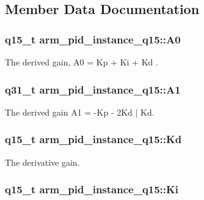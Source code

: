 \subsection{Member Data Documentation}
\hypertarget{structarm__pid__instance__q15_ad77f3a2823c7f96de42c92a3fbf3246b}{
\subsubsection[{A0}]{\setlength{\rightskip}{0pt plus 5cm}q15\-\_\-t arm\-\_\-pid\-\_\-instance\-\_\-q15\-::\-A0}}\label{structarm__pid__instance__q15_ad77f3a2823c7f96de42c92a3fbf3246b}
The derived gain, A0 = Kp + Ki + Kd . \hypertarget{structarm__pid__instance__q15_a1b8412c517071962a9acfdc6778906ec}{
\subsubsection[{A1}]{\setlength{\rightskip}{0pt plus 5cm}q31\-\_\-t arm\-\_\-pid\-\_\-instance\-\_\-q15\-::\-A1}}\label{structarm__pid__instance__q15_a1b8412c517071962a9acfdc6778906ec}
The derived gain A1 = -\/\-Kp -\/ 2\-Kd $\vert$ Kd. \hypertarget{structarm__pid__instance__q15_af5d4b53091f19eff7536636b7cc43111}{
\subsubsection[{Kd}]{\setlength{\rightskip}{0pt plus 5cm}q15\-\_\-t arm\-\_\-pid\-\_\-instance\-\_\-q15\-::\-Kd}}\label{structarm__pid__instance__q15_af5d4b53091f19eff7536636b7cc43111}
The derivative gain. \hypertarget{structarm__pid__instance__q15_a0dcc19d5c8f7bc401acea9e8318cd777}{
\subsubsection[{Ki}]{\setlength{\rightskip}{0pt plus 5cm}q15\-\_\-t arm\-\_\-pid\-\_\-instance\-\_\-q15\-::\-Ki}}\label{structarm__pid__instance__q15_a0dcc19d5c8f7bc401acea9e8318cd777}

